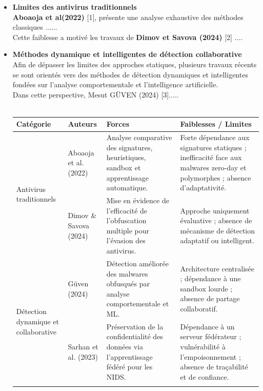 \documentclass[12pt]{report}
\begin{document}
\begin{itemize}
\begin{itemize}
 \item \textbf{Limites des antivirus traditionnels}
 \\
 \textbf{Aboaoja et al(2022)} [1], présente une analyse exhaustive des méthodes classiques ...... 
 \\
 Cette faiblesse a motivé les travaux de \textbf{Dimov et Savova (2024)} [2] ....
 \\
 \item \textbf{Méthodes dynamique et intelligentes de détection collaborative}
 \\
 Afin de dépasser les limites des approches statiques, plusieurs travaux récents se sont orientés vers des méthodes de détection dynamiques et intelligentes fondées sur l’analyse comportementale et l’intelligence artificielle. 
 \\
 Dans cette perspective, Mesut GÜVEN (2024) [3].....
 \\

\\
\begin{table}[htbp]
\centering
\small
\renewcommand{\arraystretch}{1.4}
\begin{tabular}{|p{2cm}|p{2cm}|p{4.2cm}|p{5.3cm}|}
\hline
\textbf{Catégorie} & \textbf{Auteurs}  & \textbf{Forces} & \textbf{Faiblesses / Limites} \\ \hline

\multirow{2}{3cm}{Antivirus traditionnels} 
& Aboaoja et al. (2022) 
& Analyse comparative des signatures, heuristiques, sandbox et apprentissage automatique. 
& Forte dépendance aux signatures statiques ; inefficacité face aux malwares zero-day et polymorphes ; absence d’adaptativité. \\ \cline{2-4}

& Dimov \& Savova (2024) 
& Mise en évidence de l’efficacité de l’obfuscation multiple pour l’évasion des antivirus. 
& Approche uniquement évaluative ; absence de mécanisme de détection adaptatif ou intelligent. \\ \hline

\multirow{3}{3cm}{Détection dynamique et collaborative} 
& Güven (2024) 
& Détection améliorée des malwares obfusqués par analyse comportementale et ML. 
& Architecture centralisée ; dépendance à une sandbox lourde ; absence de partage collaboratif. \\ \cline{2-4}

& Sarhan et al. (2023) 
& Préservation de la confidentialité des données via l’apprentissage fédéré pour les NIDS. 
& Dépendance à un serveur fédérateur ; vulnérabilité à l’empoisonnement ; absence de traçabilité et de confiance. \\ \cline{2-4}


\end{tabular}
\end{table}
\end{itemize}
\end{itemize}
\end{document}
